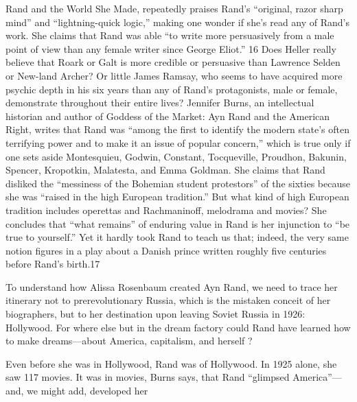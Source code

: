 Rand and the World She Made, repeatedly praises Rand’s “original, razor sharp mind” and “lightning-quick logic,” making one wonder if she’s read any of Rand’s work. She claims that Rand was able “to write more persuasively from a male point of view than any female writer since George Eliot.” {\color{blue}16} Does Heller really believe that Roark or Galt is more credible or persuasive than Lawrence Selden or New-land Archer? Or little James Ramsay, who seems to have acquired more psychic depth in his six years than any of Rand’s protagonists, male or female, demonstrate throughout their entire lives? Jennifer Burns, an intellectual historian and author of Goddess of the Market: Ayn Rand and the American Right, writes that Rand was “among the first to identify the modern state’s often terrifying power and to make it an issue of popular concern,” which is true only if one sets aside Montesquieu, Godwin, Constant, Tocqueville, Proudhon, Bakunin, Spencer, Kropotkin, Malatesta, and Emma Goldman. She claims that Rand disliked the “messiness of the Bohemian student protestors” of the sixties because she was “raised in the high European tradition.” But what kind of high European tradition includes operettas and Rachmaninoff, melodrama and movies? She concludes that “what remains” of enduring value in Rand is her injunction to “be true to yourself.” Yet it hardly took Rand to teach us that; indeed, the very same notion figures in a play about a Danish prince written roughly five centuries before Rand’s birth.{\color{blue}17}
 \par 
To understand how Alissa Rosenbaum created Ayn Rand, we need to trace her itinerary not to prerevolutionary Russia, which is the mistaken conceit of her biographers, but to her destination upon leaving Soviet Russia in 1926: Hollywood. For where else but in the dream factory could Rand have learned how to make dreams—about America, capitalism, and herself ?
 \par 
Even before she was in Hollywood, Rand was of Hollywood. In 1925 alone, she saw {\color{blue}117} movies. It was in movies, Burns says, that Rand “glimpsed America”—and, we might add, developed her
 \par 
